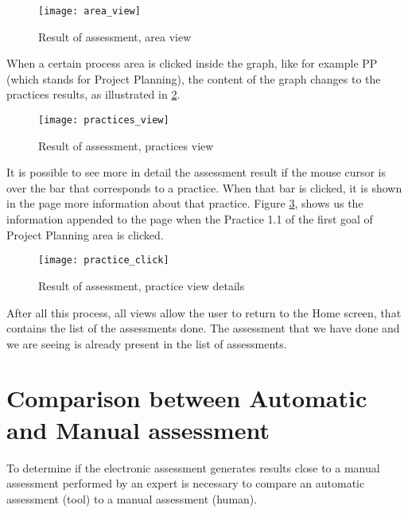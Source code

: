 \begin{figure}[h]
	\begin{center}
		\leavevmode
		\texttt{[image: area\_view]}
		\caption{Result of assessment, area view}
		\label{fig:area_view}
	\end{center}
\end{figure}

When a certain process area is clicked inside the graph, like for example PP (which stands for Project Planning), the content of the graph changes to the practices results, as illustrated in \ref{fig:practices_view}.


\begin{figure}[h]
	\begin{center}
		\leavevmode
		\texttt{[image: practices\_view]}
		\caption{Result of assessment, practices view}
		\label{fig:practices_view}
	\end{center}
\end{figure}

It is possible to see more in detail the assessment result if the mouse cursor is over the bar that corresponds to a practice. When that bar is clicked, it is shown in the page more information about that practice. Figure \ref{fig:practice_click}, shows us the information appended to the page when the Practice 1.1 of the first goal of Project Planning area is clicked.

\begin{figure}[!htb]
	\begin{center}
		\leavevmode
		\texttt{[image: practice\_click]}
		\caption{Result of assessment, practice view details}
		\label{fig:practice_click}
	\end{center}
\end{figure}

After all this process, all views allow the user to return to the Home screen, that contains the list of the assessments done. The assessment that we have done and we are seeing is already present in the list of assessments.
 
\section{Comparison between Automatic and Manual assessment} \label{sec:automatic}

To determine if the electronic assessment generates results close to a manual assessment performed by an expert is necessary to compare an automatic assessment (tool) to a manual assessment (human).

